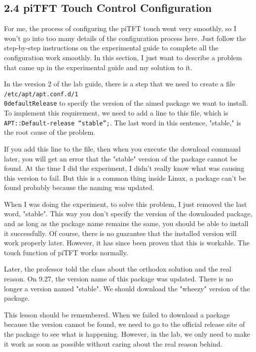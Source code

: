 \documentclass[12pt]{report}
\newcommand{\code}[1]{\colorbox{light-gray}{\texttt{#1}}}
\begin{document}
\subsection*{2.4 piTFT Touch Control Configuration}\vspace{-1em}
For me, the process of configuring the piTFT touch went very smoothly, so I won't go into too many details of the configuration process here. Just follow the step-by-step instructions on the experimental guide to complete all the configuration work smoothly. In this section, I just want to describe a problem that came up in the experimental guide and my solution to it.\par
In the version 2 of the lab guide, there is a step that we need to create a file \code{/etc/apt/apt.conf.d/1}\\\code{0defaultRelease} to specify the version of the aimed package we want to install. To implement this requirement, we need to add a line to this file, which is \code{APT::Default-release “stable”;}. The last word in this sentence, "stable," is the root cause of the problem. \par
If you add this line to the file, then when you execute the download command later, you will get an error that the "stable" version of the package cannot be found. At the time I did the experiment, I didn't really know what was causing this version to fail. But this is a common thing inside Linux, a package can't be found probably because the naming was updated.\par
When I was doing the experiment, to solve this problem, I just removed the last word, "stable". This way you don't specify the version of the downloaded package, and as long as the package name remains the same, you should be able to install it successfully. Of course, there is no guarantee that the installed version will work properly later. However, it has since been proven that this is workable. The touch function of piTFT works normally.\par
Later, the professor told the class about the orthodox solution and the real reason. On 9.27, the version name of this package was updated. There is no longer a version named "stable". We should download the "wheezy" version of the package.\par
This lesson should be remembered. When we failed to download a package because the version cannot be found, we need to go to the official release site of the package to see what is happening. However, in the lab, we only need to make it work as soon as possible without caring about the real reason behind.\vspace{-1em}
\end{document}
